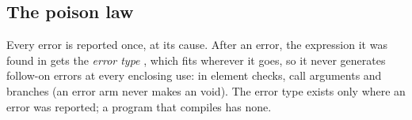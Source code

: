 \subsection{The poison law}
\label{sec:poison}

Every error is reported once, at its cause. After an error, the
expression it was found in gets the \emph{error type} , which
fits wherever it goes, so it never generates follow-on errors at every
enclosing use: in element checks, call arguments and branches (an error
arm never makes an  void). The error type exists only where an
error was reported; a program that compiles has none.
